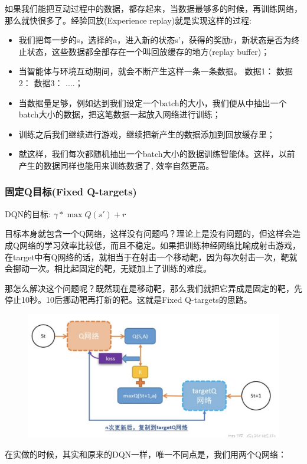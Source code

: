 \documentclass[12pt]{article}
\begin{document}
如果我们能把互动过程中的数据，都存起来，当数据最够多的时候，再训练网络，那么就快很多了。经验回放(Experience replay)就是实现这样的过程:
\begin{itemize}
\setlength{\itemsep}{0pt}
\setlength{\parsep}{0pt}
\setlength{\parskip}{0pt}
    \item 我们把每一步的s，选择的a，进入新的状态s'，获得的奖励r，新状态是否为终止状态，这些数据都全部存在一个叫回放缓存的地方(replay buffer)；
    \item 当智能体与环境互动期间，就会不断产生这样一条一条数据。 数据1： 数据2： 数据3： ....；
    \item 当数据量足够，例如达到我们设定一个batch的大小，我们便从中抽出一个batch大小的数据，把这笔数据一起放入网络进行训练；
    \item 训练之后我们继续进行游戏，继续把新产生的数据添加到回放缓存里；
    \item 就这样，我们每次都随机抽出一个batch大小的数据训练智能体。这样，以前产生的数据同样也能用来训练数据了, 效率自然更高。
\end{itemize}

\subsubsection{固定Q目标(Fixed Q-targets)}
DQN的目标: $\gamma * \max Q(s') + r$
 
目标本身就包含一个Q网络，这样没有问题吗？理论上是没有问题的，但这样会造成Q网络的学习效率比较低，而且不稳定。如果把训练神经网络比喻成射击游戏，在target中有Q网络的话，就相当于在射击一个移动靶，因为每次射击一次，靶就会挪动一次。相比起固定的靶，无疑加上了训练的难度。

那怎么解决这个问题呢？既然现在是移动靶，那么我们就把它弄成是固定的靶，先停止10秒。10后挪动靶再打新的靶。这就是Fixed Q-targets的思路。
\begin{figure}[H]
    \centering
    \includegraphics[width=.6\textwidth]{fig/ReinforcementLearning/RL_QLearning_Fix_Target.png}
\end{figure}

在实做的时候，其实和原来的DQN一样，唯一不同点是，我们用两个Q网络：
\end{document}
